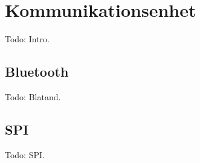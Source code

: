 %

\section{Kommunikationsenhet}
Todo: Intro.

\subsection{Bluetooth}
Todo: Blatand.

\subsection{SPI}
Todo: SPI.

